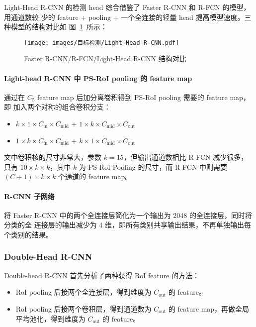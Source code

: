 Light-Head R-CNN 的检测 head 综合借鉴了 Faster R-CNN 和 R-FCN 的模型，用通道数较
少的 feature + pooling + 一个全连接的轻量 head 提高模型速度。三种模型的结构对比如
图~\ref{fig:light-head}~所示：

\begin{figure}[ht]
  \centering
  \texttt{[image: images/目标检测/Light-Head-R-CNN.pdf]}
  \caption{Faster R-CNN/R-FCN/Light-Head R-CNN 结构对比}
  \label{fig:light-head}
\end{figure}

\paragraph{Light-head R-CNN 中 PS-RoI pooling 的 feature map}
通过在 $C_5$ feature map 后加分离卷积得到 PS-RoI pooling 需要的 feature map，即
加入两个对称的组合卷积分支：

\begin{itemize}
  \item $k \times 1 \times C_{\mathrm{in}} \times C_{\mathrm{mid}}$ + $1 \times k
    \times C_{\mathrm{mid}} \times C_{\mathrm{out}}$
  \item $1 \times k \times C_{\mathrm{in}} \times C_{\mathrm{mid}}$ + $k \times 1
    \times C_{\mathrm{mid}} \times C_{\mathrm{out}}$
\end{itemize}

文中卷积核的尺寸非常大，参数 $k=15$，但输出通道数相比 R-FCN 减少很多，只有 $10
\times k \times k$，其中 $k$ 为 PS-RoI Pooling 的尺寸，而 R-FCN 中则需要 $(C+1)
\times k \times k$ 个通道的 feature map。

\paragraph{R-CNN 子网络}
将 Faster R-CNN 中的两个全连接层简化为一个输出为 2048 的全连接层，同时将分类的全
连接层的输出减少为 4 维，即所有类别共享输出结果，不再单独输出每个类别的结果。

\subsubsection{Double-Head R-CNN}
Double-head R-CNN 首先分析了两种获得 RoI feature 的方法：

\begin{itemize}
  \item RoI pooling 后接两个全连接层，得到维度为 $C_{\mathrm{out}}$ 的 feature。
  \item RoI pooling 后接两个卷积层，得到通道数为 $C_{\mathrm{out}}$ 的 feature
    map，再做全局平均池化，得到维度为 $C_{\mathrm{out}}$ 的 feature。
\end{itemize}

